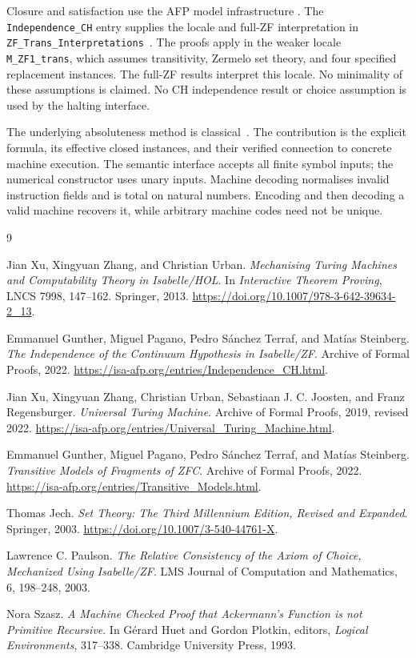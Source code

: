 \documentclass[11pt,a4paper]{article}
\newcommand{\theoremname}[1]{{\urlstyle{tt}\nolinkurl{#1}}}
\begin{document}
Closure and satisfaction use the AFP model infrastructure
\cite{afp-models}. The \texttt{Independence\_CH} entry supplies the
locale and full-ZF interpretation in
\theoremname{ZF_Trans_Interpretations}~\cite{afp-ch}.
The proofs apply in the weaker locale \texttt{M\_ZF1\_trans}, which
assumes transitivity, Zermelo set theory, and four specified replacement
instances. The full-ZF results interpret this locale. No minimality of
these assumptions is claimed. No CH independence result or choice
assumption is used by the halting interface.

The underlying absoluteness method is classical~\cite[Chapter~12]{jech}.
The contribution is the explicit formula, its effective closed instances,
and their verified connection to concrete machine execution.
The semantic interface accepts all finite symbol inputs; the numerical
constructor uses unary inputs. Machine decoding normalises invalid
instruction fields and is total on natural numbers. Encoding and then
decoding a valid machine recovers it, while arbitrary machine codes need
not be unique.



\clearpage
\begin{thebibliography}{9}

Jian Xu, Xingyuan Zhang, and Christian Urban.
\emph{Mechanising Turing Machines and Computability Theory in Isabelle/HOL}.
In \emph{Interactive Theorem Proving}, LNCS 7998, 147--162.
Springer, 2013.
\url{https://doi.org/10.1007/978-3-642-39634-2_13}.

Emmanuel Gunther, Miguel Pagano, Pedro S\'anchez Terraf, and Mat\'ias Steinberg.
\emph{The Independence of the Continuum Hypothesis in Isabelle/ZF}.
Archive of Formal Proofs, 2022.
\url{https://isa-afp.org/entries/Independence_CH.html}.

Jian Xu, Xingyuan Zhang, Christian Urban, Sebastiaan J. C. Joosten, and
Franz Regensburger.
\emph{Universal Turing Machine}.
Archive of Formal Proofs, 2019, revised 2022.
\url{https://isa-afp.org/entries/Universal_Turing_Machine.html}.

Emmanuel Gunther, Miguel Pagano, Pedro S\'anchez Terraf, and Mat\'ias Steinberg.
\emph{Transitive Models of Fragments of ZFC}.
Archive of Formal Proofs, 2022.
\url{https://isa-afp.org/entries/Transitive_Models.html}.

Thomas Jech.
\emph{Set Theory: The Third Millennium Edition, Revised and Expanded}.
Springer, 2003.
\url{https://doi.org/10.1007/3-540-44761-X}.

Lawrence C. Paulson.
\emph{The Relative Consistency of the Axiom of Choice, Mechanized Using
Isabelle/ZF}.
LMS Journal of Computation and Mathematics, 6, 198--248, 2003.

Nora Szasz.
\emph{A Machine Checked Proof that Ackermann's Function is not Primitive
Recursive}.
In G\'erard Huet and Gordon Plotkin, editors, \emph{Logical Environments},
317--338. Cambridge University Press, 1993.

\end{thebibliography}
\end{document}
